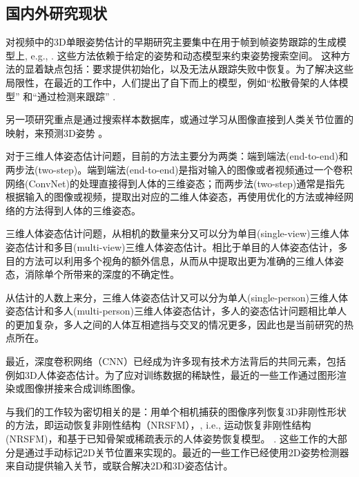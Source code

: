\begin{refsection}
\section{国内外研究现状}

对视频中的3D单眼姿势估计的早期研究主要集中在用于帧到帧姿势跟踪的生成模型上, e.g.,  \cite{bregler1998tracking,sminchisescu2003kinematic}. 
这些方法依赖于给定的姿势和动态模型来约束姿势搜索空间。
这种方法的显着缺点包括：要求提供初始化，以及无法从跟踪失败中恢复。为了解决这些局限性，在最近的工作中，人们提出了自下而上的模型，例如``松散骨架的人体模型'' \cite{sigal2012loose} 和``通过检测来跟踪'' \cite{andriluka2010monocular}.

另一项研究重点是通过搜索样本数据库\cite{shakhnarovich2003fast,mori2006recovering,jiang20103d,yasin2016dual}，或通过学习从图像直接到人类关节位置的映射，来预测3D姿势 \cite{agarwal2006recovering,bo2010twin,salzmann2010implicitly,yu2013unconstrained,ionescu2014human,kostrikov2014depth}。

对于三维人体姿态估计问题，目前的方法主要分为两类：端到端法(end-to-end)\autocite{pavlakos2017coarse}和两步法(two-step)\autocite{zhou2016sparseness}。端到端法(end-to-end)\autocite{pavlakos2017coarse}是指对输入的图像或者视频通过一个卷积网络(ConvNet)的处理直接得到人体的三维姿态；而两步法(two-step)\autocite{zhou2016sparseness}通常是指先根据输入的图像或视频，提取出对应的二维人体姿态，再使用优化的方法或神经网络的方法得到人体的三维姿态。

三维人体姿态估计问题，从相机的数量来分又可以分为单目(single-view)三维人体姿态估计和多目(multi-view)三维人体姿态估计。相比于单目的人体姿态估计，多目的方法可以利用多个视角的额外信息，从而从中提取出更为准确的三维人体姿态，消除单个所带来的深度的不确定性。

从估计的人数上来分，三维人体姿态估计又可以分为单人(single-person)三维人体姿态估计和多人(multi-person)三维人体姿态估计，多人的姿态估计问题相比单人的更加复杂，多人之间的人体互相遮挡与交叉的情况更多，因此也是当前研究的热点所在。


最近，深度卷积网络（CNN）已经成为许多现有技术方法背后的共同元素，包括例如3D人体姿态估计\cite{li20143d,li2015maximum,tekin2015predicting,du2016marker,park20163d,zhou2016deep}。为了应对训练数据的稀缺性，最近的一些工作通过图形渲染\cite{chen2016synthesizing}或图像拼接\cite{rogez2016mocap}来合成训练图像。 

与我们的工作较为密切相关的是：用单个相机捕获的图像序列恢复3D非刚性形状的方法，即运动恢复非刚性结构（NRSFM），\cite{bregler2000recovering,akhter2011trajectory,dai2012simple,zhu2014complex,cho2015complex}, i.e., 运动恢复非刚性结构 (NRSFM)，和基于已知骨架\cite{lee1985determination,taylor2000reconstruction,valmadre2010deterministic,park20113d,radwan2013monocular,leonardos2016articulated}或稀疏表示的人体姿势恢复模型。 \cite{ramakrishna2012reconstructing,fan2014pose,akhter2015pose,zhou20153d,zhou2015sparse}. 这些工作的大部分是通过手动标记2D关节位置来实现的。最近的一些工作已经使用2D姿势检测器来自动提供输入关节\cite{simo2012single,wang2014robust}，或联合解决2D和3D姿态估计\cite{simo2013joint,zhou2014spatio}。


\end{refsection}
